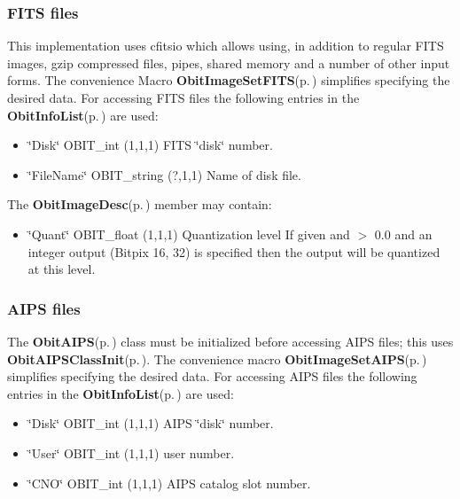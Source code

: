 \subsubsection{FITS files}\label{ObitImage_8h_ImageFITS}
This implementation uses cfitsio which allows using, in addition to regular FITS images, gzip compressed files, pipes, shared memory and a number of other input forms. The convenience Macro {\bf Obit\-Image\-Set\-FITS}{\rm (p.\,\pageref{ObitImage_8h_a3})} simplifies specifying the desired data. For accessing FITS files the following entries in the {\bf Obit\-Info\-List}{\rm (p.\,\pageref{structObitInfoList})} are used: \begin{itemize}
\item \char`\"{}Disk\char`\"{} OBIT\_\-int (1,1,1) FITS \char`\"{}disk\char`\"{} number. \item \char`\"{}File\-Name\char`\"{} OBIT\_\-string (?,1,1) Name of disk file.\end{itemize}
The {\bf Obit\-Image\-Desc}{\rm (p.\,\pageref{structObitImageDesc})} member may contain: \begin{itemize}
\item \char`\"{}Quant\char`\"{} OBIT\_\-float (1,1,1) Quantization level If given and $>$ 0.0 and an integer output (Bitpix 16, 32) is specified then the output will be quantized at this level.\end{itemize}
\subsubsection{AIPS files}\label{ObitImage_8h_ObitImageAIPS}
The {\bf Obit\-AIPS}{\rm (p.\,\pageref{structObitAIPS})} class must be initialized before accessing AIPS files; this uses {\bf Obit\-AIPSClass\-Init}{\rm (p.\,\pageref{ObitAIPS_8c_a5})}. The convenience macro {\bf Obit\-Image\-Set\-AIPS}{\rm (p.\,\pageref{ObitImage_8h_a4})} simplifies specifying the desired data. For accessing AIPS files the following entries in the {\bf Obit\-Info\-List}{\rm (p.\,\pageref{structObitInfoList})} are used: \begin{itemize}
\item \char`\"{}Disk\char`\"{} OBIT\_\-int (1,1,1) AIPS \char`\"{}disk\char`\"{} number. \item \char`\"{}User\char`\"{} OBIT\_\-int (1,1,1) user number. \item \char`\"{}CNO\char`\"{} OBIT\_\-int (1,1,1) AIPS catalog slot number.\end{itemize}
